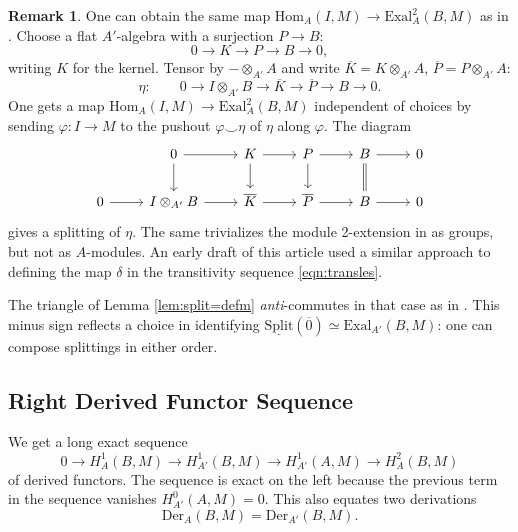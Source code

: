 \documentclass[11pt,reqno]{amsart}
\theoremstyle{definition}
\newtheorem{remark}[theorem]{Remark}
\newcommand{\Hom}{\textrm{Hom}}
\newcommand{\Der}{\textrm{Der}}
\newcommand{\Exal}{\textrm{Exal}}
\newcommand{\Split}{\underline{\textrm{Split}}}
\renewcommand{\bar}[1]{\overline{#1}}
\begin{document}
\begin{remark}

One can obtain the same map $\Hom_A(I, M) \to \Exal_A^2(B, M)$ as in \cite[\S 4]{mymoduledefms}. Choose a flat $A'$-algebra with a surjection $P \to B$:
\[0 \to K \to P \to B \to 0,\]
writing $K$ for the kernel. Tensor by $-\otimes_{A'} A$ and write $\bar K = K \otimes_{A'} A$, $\bar P = P \otimes_{A'} A$:
\[\eta : \qquad 0 \to I \otimes_{A'} B \to \bar K \to \bar P \to B \to 0.\]
One gets a map $\Hom_A(I, M) \to \Exal_A^2(B, M)$ independent of choices by sending $\varphi : I \to M$ to the pushout $\varphi \smile \eta$ of $\eta$ along $\varphi$. The diagram 
\[\begin{tikzcd}
 &0 \ar[r] \ar[d] &K \ar[r] \ar[d] &P \ar[r] \ar[d] &B \ar[r] \ar[d, equals] &0 \\
0 \ar[r]  &I \otimes_{A'} B \ar[r]  &\bar K \ar[r]  &\bar P \ar[r]  &B \ar[r]  &0
\end{tikzcd}\]
gives a splitting of $\eta$. The same trivializes the module 2-extension in \cite[\S 4]{mymoduledefms} as groups, but not as $A$-modules. An early draft of this article used a similar approach to defining the map $\delta$ in the transitivity sequence \eqref{eqn:transles}. 

The triangle of Lemma \ref{lem:split=defm} \emph{anti}-commutes in that case as in \cite[Theorem 1.6]{mymoduledefms}. This minus sign reflects a choice in identifying $\Split(\bar 0) \simeq \Exal_{A'}(B, M)$: one can compose splittings in either order. 

\end{remark}









\subsection{Right Derived Functor Sequence}






We get a long exact sequence
\begin{equation}\label{eqn:Tderfunctorles}
0 \to H^1_A(B, M) \to H^1_{A'}(B, M) \to H^1_{A'}(A, M) \to H^2_A(B, M)
\end{equation}
of derived functors. The sequence is exact on the left because the previous term in the sequence vanishes $H^0_{A'}(A, M) = 0$. This also equates two derivations 
\begin{equation}\label{eqn:derequality}
\Der_A(B, M) = \Der_{A'}(B, M).    
\end{equation}
 
\end{document}
